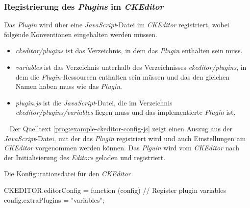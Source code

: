 \subsubsection{Registrierung des \emph{Plugins} im \emph{CKEditor}}
Das \emph{Plugin} wird über eine \emph{JavaScript}-Datei im \emph{CKEditor} registriert, wobei folgende Konventionen eingehalten werden müssen.
\begin{itemize}
	\item\emph{ckeditor/plugins} ist das Verzeichnis, in dem das \emph{Plugin} enthalten sein muss.
	\item\emph{variables} ist das Verzeichnis unterhalb des Verzeichnisses \emph{ckeditor/plugins}, in dem die \emph{Plugin}-Ressourcen enthalten sein müssen und das den gleichen Namen haben muss wie das \emph{Plugin}.
	\item\emph{plugin.js} ist die \emph{JavaScript}-Datei, die im Verzeichnis \emph{ckeditor/plugins/variables} liegen muss und das implementierte \emph{Plugin} ist. 
\end{itemize}
\ \newline
Der Quelltext \ref{prog:example-ckeditor-config-js} zeigt einen Auszug aus der \emph{JavaScript}-Datei, mit der das \emph{Plugin} registriert wird und auch Einstellungen am \emph{CKEditor} vorgenommen werden können. Das \emph{Plguin} wird vom \emph{CKEditor} nach der Initialisierung des \emph{Editors} geladen und registriert.

\begin{program}[h]
\caption{Die Konfigurationsdatei für den \emph{CKEditor}}
\label{prog:example-ckeditor-config-js}
\begin{JsCode}
CKEDITOR.editorConfig = function (config) {
    // Register plugin variables
    config.extraPlugins = "variables";
}
\end{JsCode} 
\end{program}

